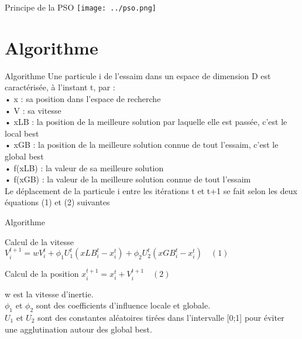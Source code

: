 \documentclass{beamer}
\begin{document}
  \begin{frame}{Principe de la PSO}
    \texttt{[image: ../pso.png]} 
  \end{frame}

\section{Algorithme}
  \begin{frame}{Algorithme}
    Une particule i de l’essaim dans un espace de dimension D est caractérisée, à l’instant t, par : \\
•	x : sa position dans l'espace de recherche \\
•	V : sa vitesse \\
•	xLB : la position de la meilleure solution par laquelle elle est passée, c'est le local best \\
•	xGB : la position de la meilleure solution connue de tout l’essaim, c'est le global best \\
•	f(xLB) : la valeur de sa meilleure solution \\
•	f(xGB) : la valeur de la meilleure solution connue de tout l’essaim \\
    Le déplacement de la particule i entre les itérations t et t+1 se fait selon les deux équations (1) et (2) suivantes \\
  \end{frame}

  \begin{frame}{Algorithme}
    \begin{block}{Calcul de la vitesse}
      $V_i^{t+1} = wV_i^t + \phi_1U_1^t(xLB_i^t-x_i^t) + \phi_2U_2^t(xGB_i^t-x_i^t) \quad (1)$
    \end{block}\pause
    \begin{block}{Calcul de la position}
      $x_i^{t+1} = x_i^t + V_i^{t+1} \quad (2)$
    \end{block}\pause
      w est la vitesse d'inertie. \\
      $\phi_1$ et $\phi_2$ sont des coefficients d'influence locale et globale. \\
      $U_1$ et $U_2$ sont des constantes aléatoires tirées dans l'intervalle [0;1] pour éviter une agglutination autour des global best.
  \end{frame}
\end{document}
